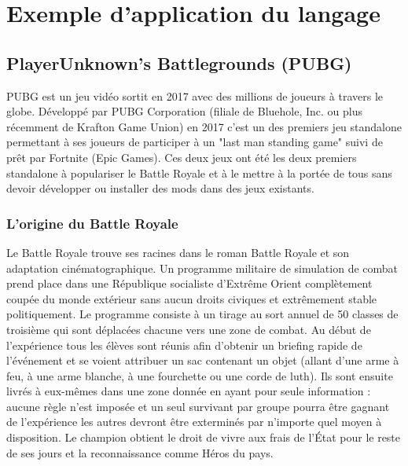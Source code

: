 \chapter{Exemple d'application du langage}
\section{PlayerUnknown's Battlegrounds (PUBG)\cite{wikipubg}}

PUBG est un jeu vidéo sortit en 2017 avec des millions de joueurs à travers le globe. Développé par PUBG Corporation (filiale de Bluehole, Inc. ou plus récemment de Krafton Game Union) en 2017 c'est un des premiers jeu standalone permettant à ses joueurs de participer à un "last man standing game" suivi de prêt par Fortnite (Epic Games). Ces deux jeux ont été les deux premiers standalone à populariser le Battle Royale et à le mettre à la portée de tous sans devoir développer ou installer des mods dans des jeux existants.

\subsection{L'origine du Battle Royale}
Le Battle Royale trouve ses racines dans le roman Battle Royale et son adaptation cinématographique. Un programme militaire de simulation de combat prend place dans une République socialiste d'Extrême Orient complètement coupée du monde extérieur sans aucun droits civiques et extrêmement stable politiquement. Le programme consiste à un tirage au sort annuel de 50 classes de troisième qui sont déplacées chacune vers une zone de combat. Au début de l'expérience tous les élèves sont réunis afin d'obtenir un briefing rapide de l'événement et se voient attribuer un sac contenant un objet (allant d'une arme à feu, à une arme blanche, à une fourchette ou une corde de luth). Ils sont ensuite livrés à eux-mêmes dans une zone donnée en ayant pour seule information : aucune règle n'est imposée et un seul survivant par groupe pourra être gagnant de l'expérience les autres devront être exterminés par n'importe quel moyen à disposition. Le champion obtient le droit de vivre aux frais de l'État pour le reste de ses jours et la reconnaissance comme Héros du pays.

